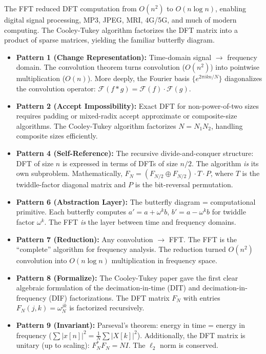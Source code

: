 The FFT reduced DFT computation from $O(n^2)$ to $O(n \log n)$, enabling digital signal processing, MP3, JPEG, MRI, 4G/5G, and much of modern computing. The Cooley-Tukey algorithm factorizes the DFT matrix into a product of sparse matrices, yielding the familiar butterfly diagram.

\begin{itemize}
\item \textbf{Pattern 1 (Change Representation):} Time-domain signal $\to$ frequency domain. The convolution theorem turns convolution ($O(n^2)$) into pointwise multiplication ($O(n)$). More deeply, the Fourier basis $\{e^{2\pi i k n / N}\}$ diagonalizes the convolution operator: $\mathcal{F}(f * g) = \mathcal{F}(f) \cdot \mathcal{F}(g)$.

\item \textbf{Pattern 2 (Accept Impossibility):} Exact DFT for non-power-of-two sizes requires padding or mixed-radix accept approximate or composite-size algorithms. The Cooley-Tukey algorithm factorizes $N = N_1 N_2$, handling composite sizes efficiently.

\item \textbf{Pattern 4 (Self-Reference):} The recursive divide-and-conquer structure: DFT of size $n$ is expressed in terms of DFTs of size $n/2$. The algorithm \emph{is} its own subproblem. Mathematically, $F_N = (F_{N/2} \oplus F_{N/2}) \cdot T \cdot P$, where $T$ is the twiddle-factor diagonal matrix and $P$ is the bit-reversal permutation.

\item \textbf{Pattern 6 (Abstraction Layer):} The butterfly diagram = computational primitive. Each butterfly computes $a' = a + \omega^k b$, $b' = a - \omega^k b$ for twiddle factor $\omega^k$. The FFT \emph{is} the layer between time and frequency domains.

\item \textbf{Pattern 7 (Reduction):} Any convolution $\to$ FFT. The FFT is the ``complete'' algorithm for frequency analysis. The reduction turned $O(n^2)$ convolution into $O(n \log n)$ multiplication in frequency space.

\item \textbf{Pattern 8 (Formalize):} The Cooley-Tukey paper gave the first clear algebraic formulation of the decimation-in-time (DIT) and decimation-in-frequency (DIF) factorizations. The DFT matrix $F_N$ with entries $F_N(j,k) = \omega_N^{jk}$ is factorized recursively.

\item \textbf{Pattern 9 (Invariant):} Parseval's theorem: energy in time = energy in frequency ($\sum |x[n]|^2 = \frac{1}{N} \sum |X[k]|^2$). Additionally, the DFT matrix is unitary (up to scaling): $F_N^* F_N = N I$. The $\ell_2$ norm is conserved.
\end{itemize}

